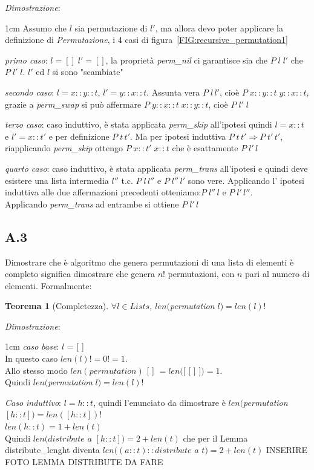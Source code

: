 \documentclass[a4paper]{article}
\newtheorem*{theorem}{Teorema}
\newenvironment{dimostrazione}{\textit{Dimostrazione}:\begin{adjustwidth}{1cm}{}}{\end{adjustwidth}}
\begin{document}
\begin{dimostrazione}
	Assumo che $l$ sia permutazione di $l'$, ma allora devo poter applicare la definizione di \textit{Permutazione}, i 4 casi di figura~\ref{FIG:recursive_permutation1} 


	\textit{primo caso}: $l=[] \; l'=[]$, la proprietà \emph{perm\_nil} ci garantisce sia che $P \;l \; l'$ che $P \; l'\; l$. $l'$ ed $l$ si sono "scambiate"


	\textit{secondo caso}: $l = x::y::t$, $l'= y::x::t$. Assunta vera $P \; l \, l'$, cioè $P \; x::y::t \; y::x::t$, grazie a \emph{perm\_swap} si può affermare $P \; y::x::t \; x::y::t$, cioè $P \; l' \; l$

	\textit{terzo caso}: caso induttivo, è stata applicata \textit{perm\_skip} all'ipotesi quindi $l = x::t$ e $l' = x::t'$ e per definizione $P \; t \, t'$.
	Ma per ipotesi induttiva $P \; t \, t' \Rightarrow P \; t' \, t'$, riapplicando \textit{perm\_skip} ottengo $P \; x::t' \; x::t$ che è esattamente $P \; l' \, l$

	\textit{quarto caso}: caso induttivo, è stata applicata \textit{perm\_trans} all'ipotesi e quindi deve esistere una lista intermedia $l''$ t.c. $P\; l\, l''$ e $P \; l''\, l'$ sono vere.
	Applicando l' ipotesi induttiva alle due affermazioni precedenti otteniamo:$P\; l''\, l$ e $P \; l'\, l''$.\\
	Applicando \textit{perm\_trans} ad entrambe si ottiene $P \; l' \, l$
\end{dimostrazione}
\subsection{A.3}
Dimostrare che è algoritmo che genera permutazioni di una lista di elementi è completo significa dimostrare che genera $n!$ permutazioni, con $n$ pari al numero di elementi. Formalmente:
\begin{theorem}[Completezza] $\forall l \in Lists$, $len($\textit{permutation} $l) = len(l)!$\end{theorem}
\begin{dimostrazione}
	\textit{caso base}: $l$ = [ ]\\
	In questo caso $len(l)! = 0! = 1$.\\
	Allo stesso modo $len(permutation)$ [ ] $= len($[ [ ] ]$) = 1$.\\
	Quindi $len($\textit{permutation} $l) = len(l)!$
	
	\textit{Caso induttivo}: $l = h::t$, quindi l'enunciato da dimostrare è $len($\textit{permutation} $[h::t]) = len([h::t])!$\\
	$len(h::t) = 1 + len(t)$\\
	Quindi $len(distribute$ $a$ $[h::t]) = 2 + len(t)$ che per il Lemma distribute\_lenght diventa $len((a::t)::distribute$ $a$ $t) = 2 + len(t)$
	INSERIRE FOTO LEMMA DISTRIBUTE
	DA FARE
\end{dimostrazione}
\end{document}
